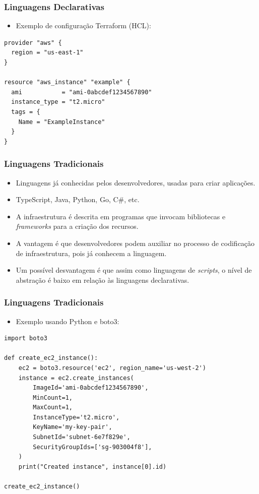 \documentclass{beamer}
\begin{document}
   \begin{frame}[fragile]
      \frametitle{Linguagens Declarativas}
      \begin{itemize}
      \item Exemplo de configuração Terraform (HCL):
      \end{itemize}
      \begin{verbatim}
provider "aws" {
  region = "us-east-1"
}

resource "aws_instance" "example" {
  ami           = "ami-0abcdef1234567890"
  instance_type = "t2.micro"
  tags = {
    Name = "ExampleInstance"
  }
}
      \end{verbatim}
   \end{frame}

   \begin{frame}
      \frametitle{Linguagens Tradicionais}
      \begin{itemize}
      \item Linguagens já conhecidas pelos desenvolvedores, usadas para criar aplicações.
      \item TypeScript, Java, Python, Go, C\#, etc.
      \item A infraestrutura é descrita em programas que invocam bibliotecas e \textit{frameworks} para a criação dos recursos.
      \item A vantagem é que desenvolvedores podem auxiliar no processo de codificação de infraestrutura, pois já conhecem a linguagem. 
      \item Um possível desvantagem é que assim como linguagens de \textit{scripts}, o nível de abstração é baixo em relação às linguagens declarativas. 
      \end{itemize}
   \end{frame}

   \begin{frame}[fragile]
      \frametitle{Linguagens Tradicionais}
      \begin{itemize}
      \item Exemplo usando Python e boto3:
      \end{itemize}
      \begin{verbatim}
import boto3

def create_ec2_instance():
    ec2 = boto3.resource('ec2', region_name='us-west-2')
    instance = ec2.create_instances(
        ImageId='ami-0abcdef1234567890',
        MinCount=1,
        MaxCount=1,
        InstanceType='t2.micro',
        KeyName='my-key-pair',
        SubnetId='subnet-6e7f829e',
        SecurityGroupIds=['sg-903004f8'],
    )
    print("Created instance", instance[0].id)

create_ec2_instance()
      \end{verbatim}
   \end{frame}
\end{document}
